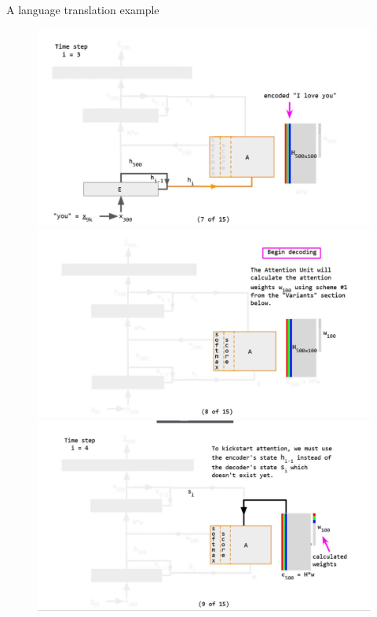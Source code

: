 \documentclass[
  notheorems,
  aspectratio=54,
]{beamer}
\begin{document}
\begin{frame}{A language translation example}
\begin{figure}
  \begin{minipage}[b]{0.4\textwidth}
    \par\medskip
    \includegraphics[width=1.3\textwidth]{./translation/7.jpg}
  \end{minipage}
  \hfill
  \begin{minipage}[b]{0.4\textwidth}
    \par\medskip
    \includegraphics[width=1.3\textwidth]{./translation/8.jpg}
  \end{minipage}
  \begin{minipage}[b]{0.4\textwidth}
    \par\medskip
    \includegraphics[width=1.3\textwidth]{./translation/9.jpg}
  \end{minipage}
\end{figure}
\end{frame}
\end{document}
